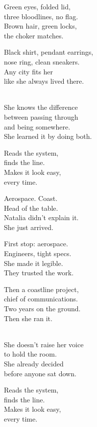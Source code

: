 \begin{lyrics}

Green eyes, folded lid,\\
three bloodlines, no flag.\\
Brown hair, green locks,\\
the choker matches.

Black shirt, pendant earrings,\\
nose ring, clean sneakers.\\
Any city fits her\\
like she always lived there.

\\
She knows the difference\\
between passing through\\
and being somewhere.\\
She learned it by doing both.

Reads the system,\\
finds the line.\\
Makes it look easy,\\
every time.

Aerospace. %
Coast.\\
Head of the table.\\
Natalia didn't explain it.\\
She just arrived.

First stop: aerospace.\\
Engineers, tight specs.\\
She made it legible.\\
They trusted the work.

Then a coastline project,\\
chief of communications.\\
Two years on the ground.\\
Then she ran it.

\\
She doesn't raise her voice\\
to hold the room.\\
She already decided\\
before anyone sat down.

Reads the system,\\
finds the line.\\
Makes it look easy,\\
every time.


\end{lyrics}
